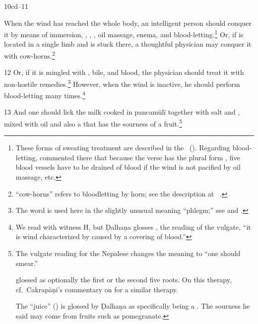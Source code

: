 \begin{translation}
    


    \item[10cd--11] 
    
When the wind has reached the whole body, an intelligent person should 
conquer
it by means of immersion, , ,
, oil massage, enema, and
blood-letting.\footnote{These forms of sweating treatment are described in the
    \CS\ (). %
    Regarding blood-letting,  commented  there that 
    because
    the verse has the plural form , five blood vessels have to
    be drained of blood if the wind is not pacified by oil massage, etc.} Or, if
    is located in a single limb and is stuck there, a thoughtful physician may
    conquer it with cow-horns.\footnote{ “cow-horns” refers to
        bloodletting by horn; see the description at \SS\ .}
        
       
            
    \item[12] Or, if it is mingled with , bile, and
blood, the physician should treat it with non-hostile
remedies.\footnote{The word  is used here in the
    slightly unusual meaning “phlegm;” see  and \cite[553]{josi-maha}.} However, when the
    wind is inactive, he should perform blood-letting many
    times.\footnote{We read  with witness H, but
        Ḍalhaṇa glosses , the reading of the vulgate, “it is
        wind characterized by  caused by a covering
        of blood.”}

    \item[13] And one should lick the milk cooked in \gls{pancamūlī}
together with salt and ,
mixed with oil and also a  that has the sourness of
a fruit.\footnote{The vulgate reading  for the Nepalese 
 changes the meaning to “one should smear.”
    
     glossed  as optionally the first  or 
    the second five roots.  On this therapy, cf.\ Cakrapāṇi's commentary on 
     for a similar therapy.
    
    The “juice” () is glossed by Ḍalhaṇa as specifically being a 
    .   The sourness he said may come from fruits 
    such as pomegranate. 
    
}
\end{translation}
